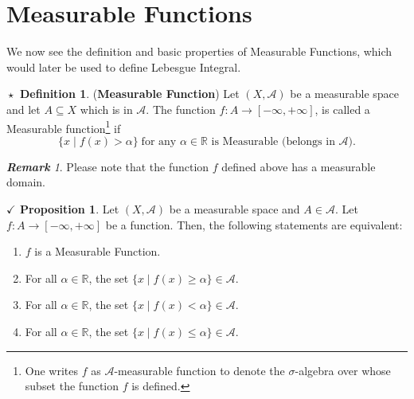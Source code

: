 \documentclass{article}
\theoremstyle{definition}
\newtheorem{definition}{$\boxed{\star}$ Definition}
\theoremstyle{remark}
\newtheorem*{remark}{\textbf{Remark}}
\theoremstyle{definition}
\theoremstyle{definition}
\newtheorem{proposition}{$\checkmark$ Proposition}
\theoremstyle{definition}
\newcommand{\where}{\;\vert\;}
\newcommand{\R}{\mathbb{R}}
\newcommand{\alg}[1]{\mathscr{#1}}
\begin{document}
\section{Measurable Functions}
We now see the definition and basic properties of Measurable Functions, which would later be used to define Lebesgue Integral.
\begin{definition}
	(\textbf{Measurable Function}) Let $ (X,\alg{A}) $ be a measurable space and let $ A \subseteq X$ which is in $ \alg{A} $. The function $ f : A\to [-\infty,+\infty] $, is called a Measurable function\footnote{One writes $ f $ as $ \alg{A} $-measurable function to denote the $ \sigma $-algebra over whose subset the function $ f $ is defined.} if 
	\[\{x \where f(x) > \alpha\}\;\text{for any }\alpha \in \R \text{ is Measurable (belongs in $\alg{A} $).}\]
\end{definition}
\begin{remark}
	Please note that the function $ f $ defined above has a measurable domain. 
\end{remark}
\hrulefill
\begin{proposition}\label{P-17}
	Let $ (X,\alg{A}) $ be a measurable space and $ A\in \alg{A} $. Let $ f : A\to [-\infty,+\infty]$ be a function. Then, the following statements are equivalent:
	\begin{enumerate}
		\item {$ f $ is a Measurable Function.}
		\item {For all $ \alpha \in \R $, the set $ \{x\where f(x)\ge \alpha\} \in \alg{A}$.}
		\item {For all $ \alpha \in \R $, the set $ \{x\where f(x)< \alpha\} \in \alg{A}$.}
		\item {For all $ \alpha \in \R $, the set $ \{x\where f(x)\le \alpha\} \in \alg{A}$.}
	\end{enumerate}
\end{proposition}
\end{document}

